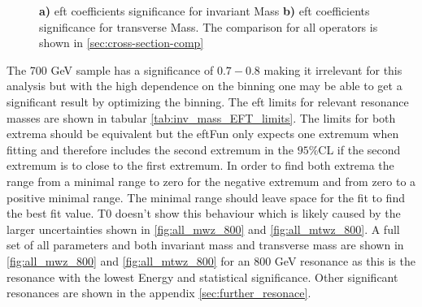 \documentclass[../Bachelorarbeit.tex]{subfiles}
\begin{document}
\begin{figure}[h]
\begin{subfigure}{0.45\textwidth}
        \caption{}
    \end{subfigure}
    \caption{\textbf{a)} \acrshort{eft} coefficients significance for invariant Mass \textbf{b)} \acrshort{eft} coefficients significance for transverse Mass. The comparison for all operators is shown in \ref{sec:cross-section-comp}}
    \label{fig:corss-section-comparission}
\end{figure}

The 700 GeV sample has a significance of $0.7-0.8$ making it irrelevant for this analysis
but with the high dependence on the binning one may be able to get a significant result by optimizing the binning. The \acrshort{eft} limits for relevant resonance masses are shown in tabular \ref{tab:inv_mass_EFT_limits}. The limits for both extrema should be equivalent but the \acrshort{eft}Fun only expects one extremum when fitting
and therefore includes the second extremum in the $95\%$CL if the second extremum is to close to the first extremum.  In order to find both extrema the range from a minimal range to zero for the negative extremum and from zero to a positive minimal range.
The minimal range should leave space for the fit to find the best fit value. T0 doesn't show this behaviour which is likely caused by the larger uncertainties shown in \ref{fig:all_mwz_800} and \ref{fig:all_mtwz_800}.
A full set of all parameters and both invariant mass and transverse mass are shown in \ref{fig:all_mwz_800} and \ref{fig:all_mtwz_800} for an 800 GeV resonance as this is the resonance with the lowest Energy and statistical significance. Other significant resonances are shown in the appendix \ref{sec:further_resonace}.
\end{document}
